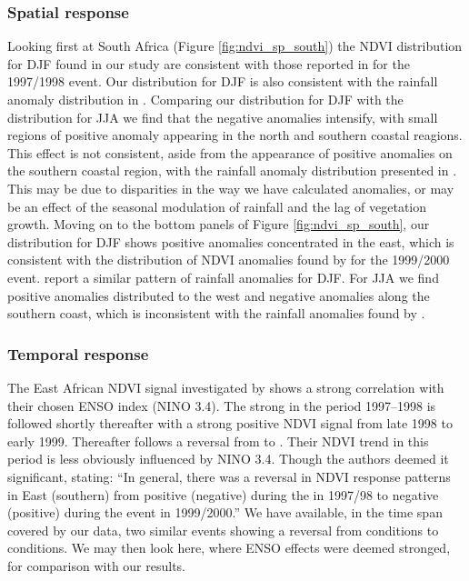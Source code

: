 \subsubsection{Spatial response}
Looking first at South Africa (Figure \ref{fig:ndvi_sp_south}) the
NDVI distribution for DJF \elnino{} found in our study are consistent
with those reported in \cite{anyamba2002} for the 1997/1998 \elnino{}
event. Our distribution for DJF \elnino{} is also consistent with the
rainfall anomaly distribution in \cite{deoliveira2018}. Comparing our
distribution for DJF \elnino{} with the distribution for JJA \elnino{}
we find that the negative anomalies intensify, with small regions of
positive anomaly appearing in the north and southern coastal
reagions. This effect is not consistent, aside from the appearance of
positive anomalies on the southern coastal region, with the rainfall
anomaly distribution presented in \cite{deoliveira2018}. This may be
due to disparities in the way we have calculated anomalies, or may be
an effect of the seasonal modulation of rainfall and the lag of
vegetation growth. Moving on to the bottom panels of Figure
\ref{fig:ndvi_sp_south}, our distribution for DJF \nina{} shows
positive anomalies concentrated in the east, which is consistent with
the distribution of NDVI anomalies found by \cite{anyamba2002} for the
1999/2000 \nina{} event. \cite{deoliveira2018} report a similar
pattern of rainfall anomalies for DJF. For JJA we find positive
anomalies distributed to the west and negative anomalies along the
southern coast, which is inconsistent with the rainfall anomalies
found by \cite{deoliveira2018}.

\subsubsection{Temporal response}

The East African NDVI signal investigated by \cite{anyamba2002} shows a strong
correlation with their chosen ENSO index (NINO 3.4). The strong \elnino{} in the
period 1997--1998 is followed shortly thereafter with a strong positive NDVI
signal from late 1998 to early 1999. Thereafter follows a reversal from
\elnino{} to \nina{}. Their NDVI trend in this period is less obviously
influenced by NINO 3.4. Though the authors deemed it significant, stating: ``In
general, there was a reversal in NDVI response patterns in East (southern) from
positive (negative) during the \elnino{} in 1997/98 to negative (positive)
during the \nina{} event in 1999/2000.'' We have available, in the time span
covered by our data, two similar events showing a reversal from \elnino{}
conditions to \nina{} conditions. We may then look here, where ENSO effects were
deemed stronged, for comparison with our results.

